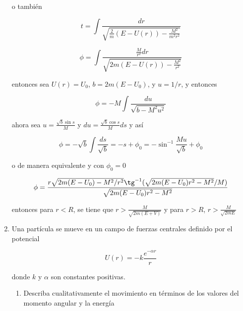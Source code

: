 \documentclass[12pt,a4paper]{article}
\begin{document}
\begin{enumerate}
o también

\begin{equation*}
    t = \int \frac{dr}{\sqrt{\frac{2}{m}(E-U(r)) - \frac{M^2}{m^2 r^2}}}
\end{equation*}

\begin{equation*}
    \phi = \int \frac{\frac{M}{r^2} dr}{\sqrt{2m(E-U(r))- \frac{M^2}{r^2}}}
\end{equation*}

entonces sea $U(r) = U_0$, $b = 2m(E-U_0)$, y $u = 1/r$, y entonces

\begin{equation*}
    \phi = -M\int \frac{du}{\sqrt{b- M^2 u^2}}
\end{equation*}

ahora sea $u = \frac{\sqrt{b}\sin{s}}{M}$ y $du = \frac{\sqrt{b}\cos{s}}{M}ds$ y así

\begin{equation*}
    \phi =- \sqrt{b} \int \frac{ds}{\sqrt{b}} = -s + \phi_0 = - \sin^{-1}{\frac{Mu}{\sqrt{b}}} + \phi_0
\end{equation*}

o de manera equivalente y con $\phi_0=0$

\begin{equation*}
    \phi = \frac{r\sqrt{2m(E-U_0)-M^2/r^2}\tg^{-1}{(\sqrt{2m(E-U_0)r^2-M^2}/M)}}{\sqrt{2m(E-U_0)r^2 - M^2}}
\end{equation*}

entonces para $r < R$, se tiene que $r > \frac{M}{\sqrt{2m(E+V)}}$ y para $r > R$, $r > \frac{M}{\sqrt{2mE}}$










\item Una partícula se mueve en un campo de fuerzas centrales definido por el potencial

\begin{equation*}
    U(r) = -k \frac{e^{-\alpha r}}{r}
\end{equation*}

donde $k$ y $\alpha$ son constantes positivas.

\begin{enumerate}
    \item Describa cualitativamente el movimiento en términos de los valores del momento angular y la energía
    

\end{enumerate}
\end{enumerate}
\end{document}
